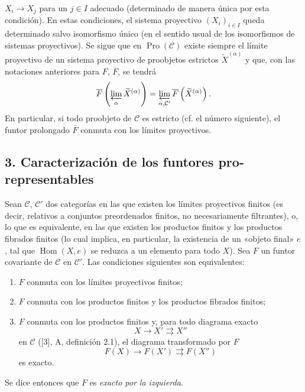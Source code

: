 \documentclass[11pt,twoside,openany]{book}
\numberwithin{equation}{section}
\newcommand{\src}[1]{%
  \phantomsection\hypertarget{src:#1}{}%
  \marginpar{\raggedleft\footnotesize\sffamily #1}%
}
\theoremstyle{plain}
\theoremstyle{definition}
\theoremstyle{remark}
\newcommand{\FgaUnitKey}{frontmatter}
\renewcommand{\src}[1]{%
  \phantomsection\hypertarget{src:\FgaUnitKey:#1}{}%
  \marginpar{\raggedleft\footnotesize\sffamily #1}%
}
\theoremstyle{plain}
\theoremstyle{definition}
\theoremstyle{remark}
\begin{document}
\src{373}
$X_i\longrightarrow X_j$ para un $j\in I$ adecuado (determinado de manera
única por esta condición). En estas condiciones, el sistema proyectivo
$(X_i)_{i\in I}$ queda determinado salvo isomorfismo único (en el sentido usual
de los isomorfismos de sistemas proyectivos). Se sigue que en
$\operatorname{Pro}(\mathcal C)$ existe siempre el límite proyectivo de un
sistema proyectivo de proobjetos estrictos $\widetilde X^{(\alpha)}$ y que, con
las notaciones anteriores para $F$, $\overline F$, se tendrá
\[
  \overline F\left(\varprojlim_\alpha\widetilde X^{(\alpha)}\right)
  =\varprojlim_{\alpha,\mathcal C'}
  \overline F\left(\widetilde X^{(\alpha)}\right).
\]
En particular, si todo proobjeto de $\mathcal C$ es estricto (cf. el número
siguiente), el funtor prolongado $\overline F$ conmuta con los límites
proyectivos.

\subsection*{3. Caracterización de los funtores pro-representables}

Sean $\mathcal C$, $\mathcal C'$ dos categorías en las que existen los límites
proyectivos finitos (es decir, relativos a conjuntos preordenados finitos, no
necesariamente filtrantes), o, lo que es equivalente, en las que existen los
productos finitos y los productos fibrados finitos (lo cual implica, en
particular, la existencia de un «objeto final» $e$, tal que
$\operatorname{Hom}(X,e)$ se reduzca a un elemento para todo $X$). Sea $F$ un
funtor covariante de $\mathcal C$ en $\mathcal C'$. Las condiciones siguientes
son equivalentes:

\begin{enumerate}
\item[(i)] $F$ conmuta con los límites proyectivos finitos;
\item[(ii)] $F$ conmuta con los productos finitos y los productos fibrados finitos;
\item[(iii)] $F$ conmuta con los productos finitos y, para todo diagrama exacto
\[
  X\longrightarrow X'\rightrightarrows X''
\]
en $\mathcal C$ ([3], A, definición 2.1), el diagrama transformado por $F$
\[
  F(X)\longrightarrow F(X')\rightrightarrows F(X'')
\]
es exacto.
\end{enumerate}

Se dice entonces que $F$ es \emph{exacto por la izquierda}.
\end{document}
